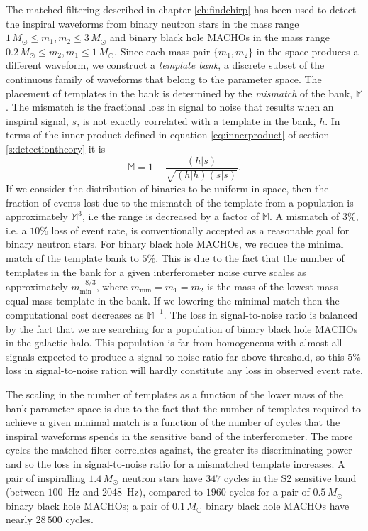 The matched filtering described in chapter \ref{ch:findchirp} has been used to
detect the inspiral waveforms from binary neutron stars in the mass range
$1\,M_\odot\le m_1, m_2\le 3\,M_\odot$ and binary black hole MACHOs in the
mass range $0.2\,M_\odot\le m_2, m_1\le 1\,M_\odot$. Since each mass pair
$\{m_1,m_2\}$ in the space produces a different waveform, we construct a {\em
template bank}, a discrete subset of the continuous family of waveforms that
belong to the parameter space. The placement of templates in the bank is
determined by the \emph{mismatch} of the bank, $\mathbb{M}$. The mismatch is
the fractional loss in signal to noise that results when an inspiral signal,
$s$, is not exactly correlated with a template in the bank, $h$. In terms of
the inner product defined in equation \ref{eq:innerproduct} of section
\ref{s:detectiontheory} it is
\begin{equation}
\mathbb{M} = 1 - \frac{(h|s)} {\sqrt{(h|h)(s|s)}}.
\end{equation}
If we consider the distribution of binaries to be uniform in space, then the
fraction of events lost due to the mismatch of the template from a population
is approximately $\mathbb{M}^3$, i.e the range is decreased by a factor of
$\mathbb{M}$. A mismatch of $3\%$, i.e. a $10\%$ loss of event rate, is
conventionally accepted as a reasonable goal for binary neutron stars. For
binary black hole MACHOs, we reduce the minimal match of the template bank to
$5\%$. This is due to the fact that the number of templates in the bank for a
given interferometer noise curve scales as approximately
$m_\mathrm{min}^{-8/3}$, where $m_\mathrm{min} = m_1 = m_2$ is the mass of the
lowest mass equal mass template in the bank\cite{Owen:1998dk}. If we lowering
the minimal match then the computational cost decreases as $\mathbb{M}^{-1}$.
The loss in signal-to-noise ratio is balanced by the fact that we are
searching for a population of binary black hole MACHOs in the galactic halo.
This population is far from homogeneous with almost all signals expected to
produce a signal-to-noise ratio far above threshold, so this $5\%$ loss in
signal-to-noise ration will hardly constitute any loss in observed event
rate.

The scaling in the number of templates as a function of the lower mass of the
bank parameter space is due to the fact that the number of templates required
to achieve a given minimal match is a function of the number of cycles that the
inspiral waveforms spends in the sensitive band of the interferometer. The
more cycles the matched filter correlates against, the greater its
discriminating power and so the loss in signal-to-noise ratio for a mismatched
template increases. A pair of inspiralling $1.4\,M_\odot$ neutron stars have
$347$ cycles in the S2 sensitive band (between $100$~Hz and $2048$~Hz),
compared to $1960$ cycles for a pair of $0.5\,M_\odot$ binary black hole
MACHOs; a pair of $0.1\,M_\odot$ binary black hole MACHOs have nearly
$28\,500$ cycles.

